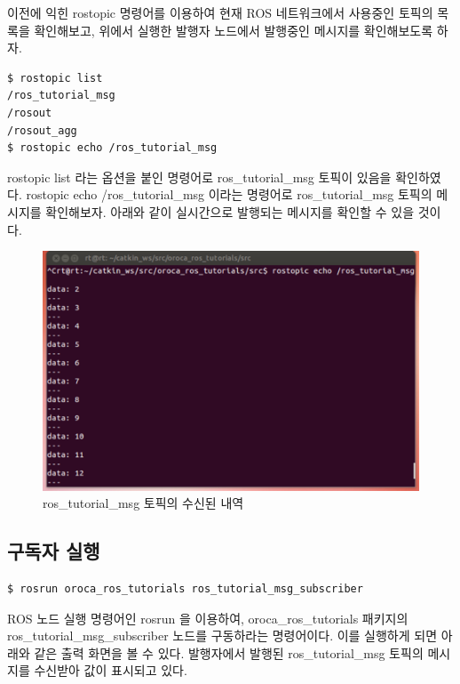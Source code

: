 이전에 익힌 rostopic 명령어를 이용하여 현재 ROS 네트워크에서 사용중인 토픽의 목록을 확인해보고, 위에서 실행한 발행자 노드에서 발행중인 메시지를 확인해보도록 하자.

\vspace{\baselineskip}
\begin{lstlisting}[language=ROS]
$ rostopic list
/ros_tutorial_msg
/rosout
/rosout_agg
$ rostopic echo /ros_tutorial_msg
\end{lstlisting}

rostopic list 라는 옵션을 붙인 명령어로 ros\_tutorial\_msg 토픽이 있음을 확인하였다. rostopic echo /ros\_tutorial\_msg 이라는 명령어로 ros\_tutorial\_msg 토픽의 메시지를 확인해보자. 아래와 같이 실시간으로 발행되는 메시지를 확인할 수 있을 것이다.

\begin{figure}[h]
\centering\includegraphics[width=0.8\columnwidth]{pictures/chapter7/rostopic_echo.png}
\caption{ros\_tutorial\_msg 토픽의 수신된 내역}
\end{figure}

\newpage
\subsection{구독자 실행}

\begin{lstlisting}[language=ROS]
$ rosrun oroca_ros_tutorials ros_tutorial_msg_subscriber 
\end{lstlisting}

ROS 노드 실행 명령어인 rosrun 을 이용하여, oroca\_ros\_tutorials 패키지의 ros\_tutorial\_msg\_subscriber  노드를 구동하라는 명령어이다. 이를 실행하게 되면 아래와 같은 출력 화면을 볼 수 있다. 발행자에서 발행된 ros\_tutorial\_msg 토픽의 메시지를 수신받아 값이 표시되고 있다.

